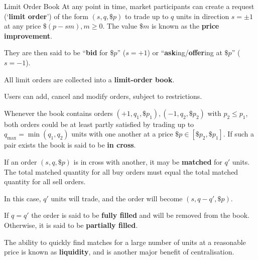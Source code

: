 \documentclass{beamer}
\begin{document}
\begin{frame}{Limit Order Book}%
	At any point in time, market participants can create a request (`\textbf{limit order}') of the form $(s,q,\$p)$ to trade up to $q$ units in direction $s=\pm1$ at any price $\$(p-sm), m\geq0$. The value $\$m$ is known as the \textbf{price improvement}. %
	
	They are then said to be ``\textbf{bid} for $\$p$'' ($s=+1$) or ``\textbf{ask}ing/\textbf{offer}ing at $\$p$'' ($s=-1$). %

	\pause

	All limit orders are collected into a \textbf{limit-order book}.

	Users can add, cancel and modify orders, subject to restrictions.%

	\pause

	Whenever the book contains orders $(+1,q_1,\$p_1), (-1,q_2,\$p_2)$ with $p_2\leq p_1$, both orders could be at least partly satisfied by trading up to $q_\max=\min(q_1,q_2)$ units with one another at a price $\$p\in[\$p_2,\$p_1]$. If such a pair exists the book is said to be \textbf{in cross}.

	\pause

	If an order $(s,q,\$p)$ is in cross with another, it may be \textbf{matched} for $q'$ units. The total matched quantity for all buy orders must equal the total matched quantity for all sell orders.

	In this case, $q'$ units will trade, and the order will become $(s,q-q',\$p)$.

	If $q=q'$ the order is said to be \textbf{fully filled} and will be removed from the book. Otherwise, it is said to be \textbf{partially filled}.

	The ability to quickly find matches for a large number of units at a reasonable price is known as \textbf{liquidity}, and is another major benefit of centralisation.
\end{frame}
\end{document}
